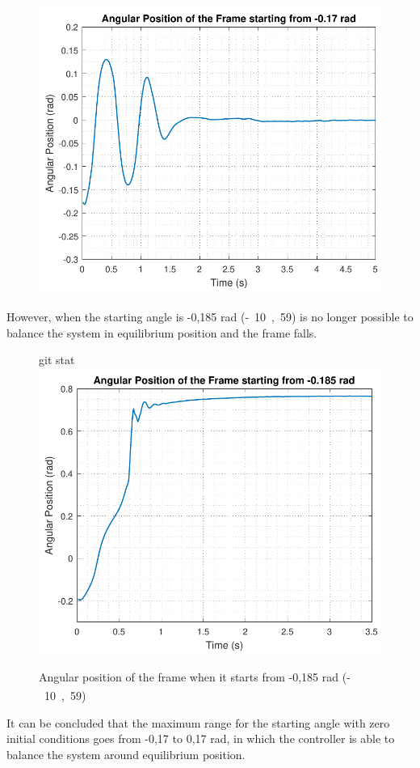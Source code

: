 \begin{minipage}{\linewidth}
\begin{minipage}{0.45\linewidth}
\begin{figure}[H]
			\includegraphics[scale=.55]{figures/testCatch_17}
			\centering
			\captionsetup{justification=centering}
			\label{testCatch_17}
		\end{figure}
	\end{minipage}
\end{minipage}

However, when the starting angle is -0,185 rad (\si{-10,59^\circ}) is no longer possible to balance the system in equilibrium position and the frame falls.

\begin{figure}[H] 
	\centering
git stat	\includegraphics[scale=0.55]{figures/testCatch_185}
	\caption{Angular position of the frame when it starts from -0,185 rad (\si{-10,59^\circ})}
	\label{testCatch_185}
\end{figure}
%
It can be concluded that the maximum range for the starting angle with zero initial conditions goes from -0,17 to 0,17 rad, in which the controller is able to balance the system around equilibrium position.